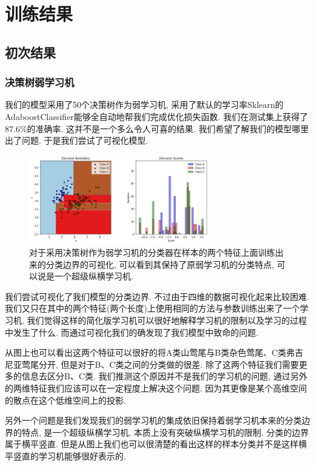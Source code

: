 \documentclass[lang=cn,11pt]{elegantpaper}
\begin{document}
\section{训练结果}
\subsection{初次结果}
\subsubsection{决策树弱学习机}
我们的模型采用了50个决策树作为弱学习机, 采用了默认的学习率Sklearn的AdaboostClassifier能够全自动地帮我们完成优化损失函数. 我们在测试集上获得了87.6\%的准确率. 这并不是一个多么令人可喜的结果. 我们希望了解我们的模型哪里出了问题. 于是我们尝试了可视化模型.

\begin{figure}[htbp]
  \centering
    \includegraphics[width=0.7\textwidth]{ada_tree}
    \caption{对于采用决策树作为弱学习机的分类器在样本的两个特征上面训练出来的分类边界的可视化, 可以看到其保持了原弱学习机的分类特点, 可以说是一个超级纵横学习机.}
  \end{figure}
我们尝试可视化了我们模型的分类边界. 不过由于四维的数据可视化起来比较困难. 我们又只在其中的两个特征(两个长度)上使用相同的方法与参数训练出来了一个学习机, 我们觉得这样的简化版学习机可以很好地解释学习机的限制以及学习的过程中发生了什么. 而通过可视化我们的确发现了我们模型中致命的问题.


从图上也可以看出这两个特征可以很好的将A类山莺尾与B类杂色莺尾、C类弗吉尼亚莺尾分开, 但是对于B、C类之间的分类做的很差. 除了这两个特征我们需要更多的信息去区分B、C类. 我们推测这个原因并不是我们的学习机的问题, 通过另外的两维特征我们应该可以在一定程度上解决这个问题. 因为其更像是某个高维空间的散点在这个低维空间上的投影.

另外一个问题是我们发现我们的弱学习机的集成依旧保持着弱学习机本来的分类边界的特点, 是一个超级纵横学习机, 本质上没有突破纵横学习机的限制. 分类的边界属于横平竖直. 但是从图上我们也可以很清楚的看出这样的样本分类并不是这样横平竖直的学习机能够很好表示的.
\end{document}
